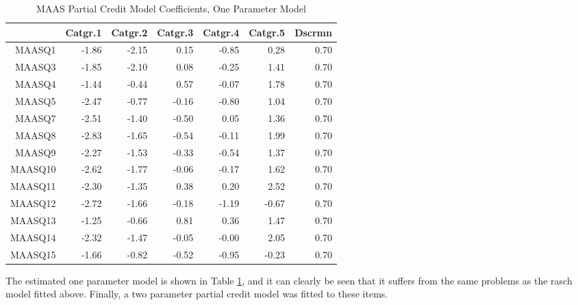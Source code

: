 \documentclass{article}
\begin{document}
\begin{table}[ht]
\centering
\begin{tabular}{rrrrrrr}
  \hline
 & Catgr.1 & Catgr.2 & Catgr.3 & Catgr.4 & Catgr.5 & Dscrmn \\ 
  \hline
MAASQ1 & -1.86 & -2.15 & 0.15 & -0.85 & 0.28 & 0.70 \\ 
  MAASQ3 & -1.85 & -2.10 & 0.08 & -0.25 & 1.41 & 0.70 \\ 
  MAASQ4 & -1.44 & -0.44 & 0.57 & -0.07 & 1.78 & 0.70 \\ 
  MAASQ5 & -2.47 & -0.77 & -0.16 & -0.80 & 1.04 & 0.70 \\ 
  MAASQ7 & -2.51 & -1.40 & -0.50 & 0.05 & 1.36 & 0.70 \\ 
  MAASQ8 & -2.83 & -1.65 & -0.54 & -0.11 & 1.99 & 0.70 \\ 
  MAASQ9 & -2.27 & -1.53 & -0.33 & -0.54 & 1.37 & 0.70 \\ 
  MAASQ10 & -2.62 & -1.77 & -0.06 & -0.17 & 1.62 & 0.70 \\ 
  MAASQ11 & -2.30 & -1.35 & 0.38 & 0.20 & 2.52 & 0.70 \\ 
  MAASQ12 & -2.72 & -1.66 & -0.18 & -1.19 & -0.67 & 0.70 \\ 
  MAASQ13 & -1.25 & -0.66 & 0.81 & 0.36 & 1.47 & 0.70 \\ 
  MAASQ14 & -2.32 & -1.47 & -0.05 & -0.00 & 2.05 & 0.70 \\ 
  MAASQ15 & -1.66 & -0.82 & -0.52 & -0.95 & -0.23 & 0.70 \\ 
   \hline
\end{tabular}
\caption{MAAS Partial Credit Model Coefficients, One Parameter Model} 
\label{tab:maaspcm1pl}
\end{table}
The estimated one parameter model is shown in Table \ref{tab:maaspcm1pl}, and it can clearly be seen that it suffers from the same problems as the rasch model fitted above. Finally, a two parameter partial credit model was fitted to these items. 
\end{document}
